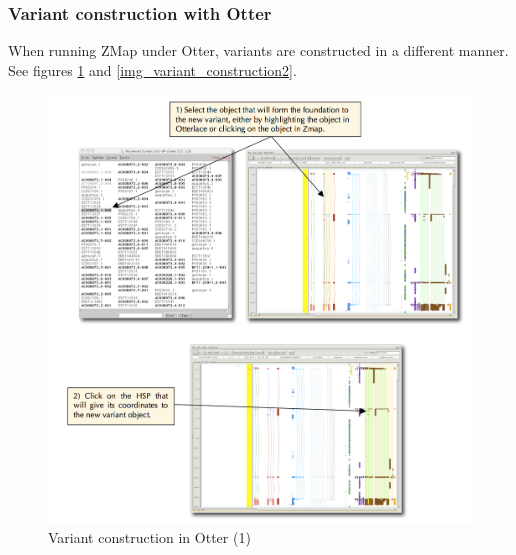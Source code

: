 \documentclass[letterpaper]{article}
\begin{document}
\subsubsection{Variant construction with Otter}
When running ZMap under Otter, variants are constructed in a different manner. See figures \ref{img_variant_construction} and \ref{img_variant_construction2}.

\begin{figure}
\centering
\color[rgb]{0.30980393,0.5058824,0.7411765}
\includegraphics[width=15.231cm]{img_variant_construction.png}
\caption{Variant construction in Otter (1)}
\label{img_variant_construction}
\end{figure}
\end{document}
